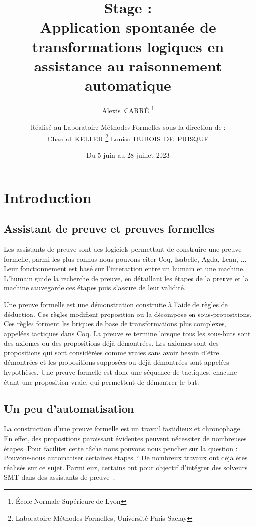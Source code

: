 \documentclass[titlepage,draft]{article}
\begin{document}
\title{
    Stage :\\[1em]
    Application spontanée de transformations logiques en assistance au raisonnement automatique
}
\date{Du 5 juin au 28 juillet 2023}
\author{
    Alexis~CARRÉ \thanks{École Normale Supérieure de Lyon}
    \vspace{1em}
    \and
    Réalisé au Laboratoire Méthodes Formelles sous la direction de :\\[1em]
    Chantal~KELLER \thanks{Laboratoire Méthodes Formelles, Université Paris Saclay}
    \hspace{1em}
    Louise~DUBOIS~DE~PRISQUE\footnotemark[2]
    \vspace{2em}
}
\maketitle



\tableofcontents
\newpage



\section{Introduction}
\subsection{Assistant de preuve et preuves formelles}
Les assistants de preuve sont des logiciels permettant de construire une preuve formelle, parmi les plus connus nous pouvons citer Coq, Isabelle, Agda, Lean, ... Leur fonctionnement est basé sur l'interaction entre un humain et une machine. L'humain guide la recherche de preuve, en détaillant les étapes de la preuve et la machine sauvegarde ces étapes puis s'assure de leur validité.

Une preuve formelle est une démonstration construite à l'aide de règles de déduction.
Ces règles modifient proposition ou la décompose en sous-propositions. Ces règles forment les briques de base de transformations plus complexes, appelées tactiques dans Coq. La preuve se termine lorsque tous les sous-buts sont des axiomes ou des propositions déjà démontrées. Les axiomes sont des propositions qui sont considérées comme vraies sans avoir besoin d'être démontrées et les propositions supposées ou déjà démontrées sont appelées hypothèses. Une preuve formelle est donc une séquence de tactiques, chacune étant une proposition vraie, qui permettent de démontrer le but.

\subsection{Un peu d'automatisation}
La construction d'une preuve formelle est un travail fastidieux et chronophage. En effet, des propositions paraissant évidentes peuvent nécessiter de nombreuses étapes.
Pour faciliter cette tâche nous pouvons nous pencher sur la question : Pouvons-nous automatiser certaines étapes ? De nombreux travaux ont déjà étés réalisés sur ce sujet. Parmi eux, certains ont pour objectif d'intégrer des solveurs SMT dans des assistants de preuve~\cite{DBLP:conf/cpp/ArmandFGKTW11}.
\end{document}
